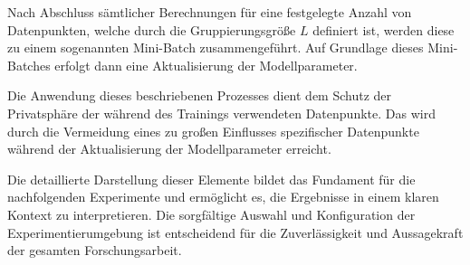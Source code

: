 Nach Abschluss sämtlicher Berechnungen für eine festgelegte Anzahl von Datenpunkten, welche durch die Gruppierungsgröße $L$ definiert ist, werden diese zu einem sogenannten Mini-Batch zusammengeführt. Auf Grundlage dieses Mini-Batches erfolgt dann eine Aktualisierung der Modellparameter.

Die Anwendung dieses beschriebenen Prozesses dient dem Schutz der Privatsphäre der während des Trainings verwendeten Datenpunkte. Das wird durch die Vermeidung eines zu großen Einflusses spezifischer Datenpunkte während der Aktualisierung der Modellparameter erreicht.

Die detaillierte Darstellung dieser Elemente bildet das Fundament für die nachfolgenden Experimente und ermöglicht es, die Ergebnisse in einem klaren Kontext zu interpretieren. Die sorgfältige Auswahl und Konfiguration der Experimentierumgebung ist entscheidend für die Zuverlässigkeit und Aussagekraft der gesamten Forschungsarbeit.